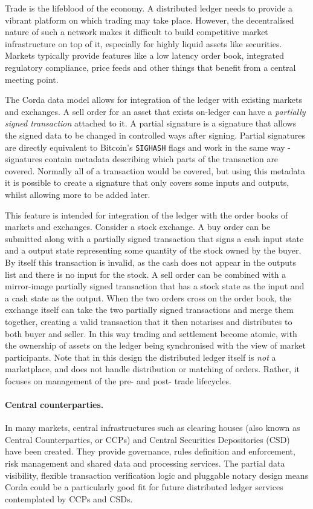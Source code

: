 \documentclass{article}
\begin{document}
Trade is the lifeblood of the economy. A distributed ledger needs to provide a vibrant platform on which trading may
take place. However, the decentralised nature of such a network makes it difficult to build competitive
market infrastructure on top of it, especially for highly liquid assets like securities. Markets typically provide
features like a low latency order book, integrated regulatory compliance, price feeds and other things that benefit
from a central meeting point.

The Corda data model allows for integration of the ledger with existing markets and exchanges. A sell order for
an asset that exists on-ledger can have a \emph{partially signed transaction} attached to it. A partial
signature is a signature that allows the signed data to be changed in controlled ways after signing. Partial signatures
are directly equivalent to Bitcoin's \texttt{SIGHASH} flags and work in the same way - signatures contain metadata
describing which parts of the transaction are covered. Normally all of a transaction would be covered, but using this
metadata it is possible to create a signature that only covers some inputs and outputs, whilst allowing more to be
added later.

This feature is intended for integration of the ledger with the order books of markets and exchanges. Consider a stock
exchange. A buy order can be submitted along with a partially signed transaction that signs a cash input state
and a output state representing some quantity of the stock owned by the buyer. By itself this transaction is invalid,
as the cash does not appear in the outputs list and there is no input for the stock. A sell order can be combined with
a mirror-image partially signed transaction that has a stock state as the input and a cash state as the output. When
the two orders cross on the order book, the exchange itself can take the two partially signed transactions and merge
them together, creating a valid transaction that it then notarises and distributes to both buyer and seller. In this
way trading and settlement become atomic, with the ownership of assets on the ledger being synchronised with the view
of market participants. Note that in this design the distributed ledger itself is \emph{not} a marketplace, and does
not handle distribution or matching of orders. Rather, it focuses on management of the pre- and post- trade lifecycles.

\paragraph{Central counterparties.}In many markets, central infrastructures such as clearing houses (also known as
Central Counterparties, or CCPs) and Central Securities Depositories (CSD) have been created. They provide governance,
rules definition and enforcement, risk management and shared data and processing services. The partial data visibility,
flexible transaction verification logic and pluggable notary design means Corda could be a particularly good fit for
future distributed ledger services contemplated by CCPs and CSDs.
\end{document}

